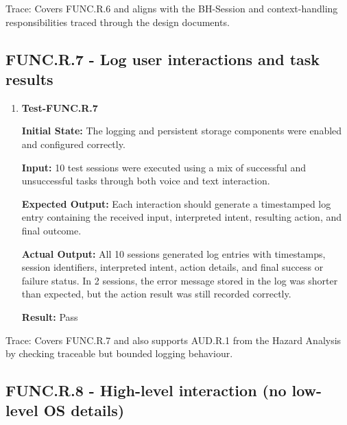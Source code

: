 \documentclass[12pt]{article}
\begin{document}
\noindent Trace: Covers FUNC.R.6 and aligns with the BH-Session and
context-handling responsibilities traced through the design documents.


\subsection{FUNC.R.7 - Log user interactions and task results}

\begin{enumerate}
    \item \textbf{Test-FUNC.R.7}
    
    \textbf{Initial State:} The logging and persistent storage
    components were enabled and configured correctly.
    
    \textbf{Input:} 10 test sessions were executed using a mix of
    successful and unsuccessful tasks through both voice and text
    interaction.
    
    \textbf{Expected Output:} Each interaction should generate a
    timestamped log entry containing the received input, interpreted
    intent, resulting action, and final outcome.
    
    \textbf{Actual Output:} All 10 sessions generated log entries with
    timestamps, session identifiers, interpreted intent, action
    details, and final success or failure status. In 2 sessions, the
    error message stored in the log was shorter than expected, but the
    action result was still recorded correctly.
    
    \textbf{Result:} Pass
\end{enumerate}

\noindent Trace: Covers FUNC.R.7 and also supports AUD.R.1 from the Hazard
Analysis by checking traceable but bounded logging behaviour.


\subsection{FUNC.R.8 - High-level interaction (no low-level OS details)}
\end{document}
